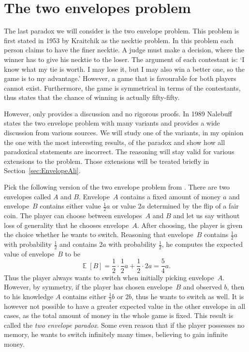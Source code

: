 \documentclass[a4paper]{report}
\theoremstyle{plain}
\theoremstyle{definition}
\theoremstyle{remark}
\numberwithin{equation}{chapter}
\DeclareMathOperator{\E}{\mathbb{E}}
\DeclareMathOperator{\1}{\mathbbm{1}}
\begin{document}
\chapter{The two envelopes problem}\label{chap:TwoEnvelope}
The last paradox we will consider is the two envelope problem. This problem is first stated in 1953 by Kraitchik \cite{Kraitchik53} as the necktie problem. In this problem each person claims to have the finer necktie. A judge must make a decision, where the winner has to give his necktie to the loser. The argument of each contestant is: `I know what my tie is worth. I may lose it, but I may also win a better one, so the game is to my advantage.' However, a game that is favourable for both players cannot exist. Furthermore, the game is symmetrical in terms of the contestants, thus \cite{Kraitchik53} states that the chance of winning is actually fifty-fifty.

However, \cite{Kraitchik53} only provides a discussion and no rigorous proofs. In 1989 Nalebuff \cite{Nalebuff89} states the two envelope problem with many variants and provides a wide discussion from various sources. We will study one of the variants, in my opinion the one with the most interesting results, of the paradox and show how all paradoxical statements are incorrect. The reasoning will stay valid for various extensions to the problem. Those extensions will be treated briefly in Section~\ref{sec:EnvelopeAli}.

Pick the following version of the two envelope problem from \cite{Nalebuff89}. There are two envelopes called $A$ and $B$. Envelope~$A$ contains a fixed amount of money $a$ and envelope~$B$ contains either value $\frac{1}{2}a$ or value $2a$ determined by the flip of a fair coin. The player can choose between envelopes~$A$ and $B$ and let us say without loss of generality that he chooses envelope~$A$. After choosing, the player is given the choice whether he wants to switch. Reasoning that envelope~$B$ contains $\frac{1}{2}a$ with probability $\frac{1}{2}$ and contains $2a$ with probability $\frac{1}{2}$, he computes the expected value of envelope~$B$ to be
\begin{equation}\label{eq:EnvelopeIntroWrong}
\E[B]=\frac{1}{2}\cdot\frac{1}{2}a+\frac{1}{2}\cdot2a=\frac{5}{4}a.
\end{equation}
Thus the player always wants to switch when initially picking envelope~$A$. However, by symmetry, if the player has chosen envelope~$B$ and observed $b$, then to his knowledge $A$ contains either $\frac{1}{2}b$ or $2b$, thus he wants to switch as well. It is however not possible to have a greater expected value in the other envelope in all cases, as the total amount of money in the whole game is fixed. This result is called the \emph{two envelope paradox}. Some even reason that if the player possesses no memory, he wants to switch infinitely many times, believing to gain infinite money.
\end{document}

